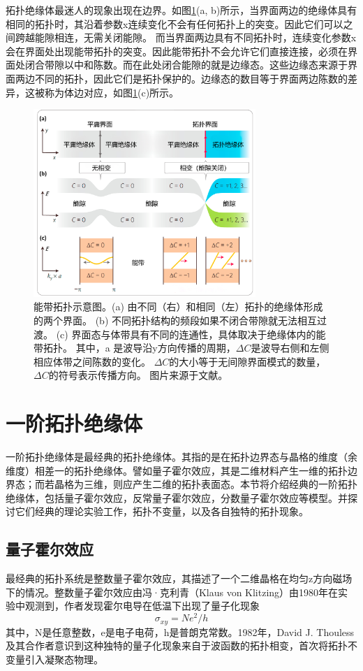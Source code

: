 拓扑绝缘体最迷人的现象出现在边界。如图\ref{fig:TopoBand}(a, b)所示，当界面两边的绝缘体具有相同的拓扑时，其沿着参数x连续变化不会有任何拓扑上的突变。因此它们可以之间跨越能隙相连，无需关闭能隙。
而当界面两边具有不同拓扑时，连续变化参数x会在界面处出现能带拓扑的突变。因此能带拓扑不会允许它们直接连接，必须在界面处闭合带隙以中和陈数。而在此处闭合能隙的就是边缘态。这些边缘态来源于界面两边不同的拓扑，因此它们是拓扑保护的。边缘态的数目等于界面两边陈数的差异，这被称为体边对应，如图\ref{fig:TopoBand}(c)所示。
\begin{figure}[htbp]
	\centering
	\includegraphics[width=0.75\textwidth]{figure/Introduction/TopoBand.jpg}
 \caption{能带拓扑示意图。(a) 由不同（右）和相同（左）拓扑的绝缘体形成的两个界面。
(b) 不同拓扑结构的频段如果不闭合带隙就无法相互过渡。
(c) 界面态与体带具有不同的连通性，具体取决于绝缘体内的能带拓扑。
 其中，a 是波导沿y方向传播的周期，$\Delta C$是波导右侧和左侧相应体带之间陈数的变化。
 $\Delta C$的大小等于无间隙界面模式的数量，$\Delta C$的符号表示传播方向。
图片来源于文献\cite{lu2014topological}。}

 \label{fig:TopoBand}
\end{figure}

\section{一阶拓扑绝缘体}
一阶拓扑绝缘体是最经典的拓扑绝缘体。其指的是在拓扑边界态与晶格的维度（余维度）相差一的拓扑绝缘体。譬如量子霍尔效应，其是二维材料产生一维的拓扑边界态；而若晶格为三维，则应产生二维的拓扑表面态。本节将介绍经典的一阶拓扑绝缘体，包括量子霍尔效应，反常量子霍尔效应，分数量子霍尔效应等模型。并探讨它们经典的理论实验工作，拓扑不变量，以及各自独特的拓扑现象。

\subsection{量子霍尔效应}
最经典的拓扑系统是整数量子霍尔效应，其描述了一个二维晶格在均匀z方向磁场下的情况。整数量子霍尔效应由冯·克利青（Klaus von Klitzing）由1980年在实验中观测到\cite{klitzing1980new}，作者发现霍尔电导在低温下出现了量子化现象
\begin{equation}
	\sigma_{xy}=Ne^2/h
\end{equation}
其中，N是任意整数，e是电子电荷，h是普朗克常数。1982年，David J. Thouless及其合作者意识到这种独特的量子化现象来自于波函数的拓扑相变\cite{thouless1982quantized}，首次将拓扑不变量引入凝聚态物理。

